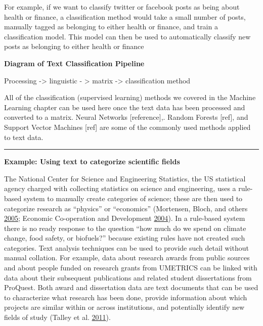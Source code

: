 \documentclass[]{krantz}
\begin{document}
For example, if we want to classify twitter or facebook posts as being
about health or finance, a classification method would take a small
number of posts, manually tagged as belonging to either health or
finance, and train a classification model. This model can then be used
to automatically classify new posts as belonging to either health or
finance

\textbf{Diagram of Text Classification Pipeline}

Processing -\textgreater{} linguistic - \textgreater{} matrix
-\textgreater{} classification method

All of the classification (supervised learning) methods we covered in
the Machine Learning chapter can be used here once the text data has
been processed and converted to a matrix. Neural Networks
{[}reference{]},. Random Forests {[}ref{]}, and Support Vector Machines
{[}ref{]} are some of the commonly used methods applied to text data.

\begin{center}\rule{0.5\linewidth}{\linethickness}\end{center}

\textbf{Example: Using text to categorize scientific fields}

The National Center for Science and Engineering Statistics, the US
statistical agency charged with collecting statistics on science and
engineering, uses a rule-based system to manually create categories of
science; these are then used to categorize research as ``physics'' or
``economics'' (Mortensen, Bloch, and others
\protect\hyperlink{ref-oecd2005measurement}{2005}; Economic Co-operation
and Development \protect\hyperlink{ref-manual2004summary}{2004}). In a
rule-based system there is no ready response to the question ``how much
do we spend on climate change, food safety, or biofuels?'' because
existing rules have not created such categories. Text analysis
techniques can be used to provide such detail without manual collation.
For example, data about research awards from public sources and about
people funded on research grants from UMETRICS can be linked with data
about their subsequent publications and related student dissertations
from ProQuest. Both award and dissertation data are text documents that
can be used to characterize what research has been done, provide
information about which projects are similar within or across
institutions, and potentially identify new fields of study (Talley et
al. \protect\hyperlink{ref-talley2011database}{2011}).
\end{document}

